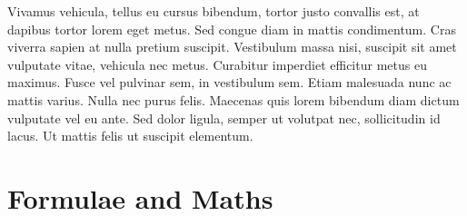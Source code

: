 Vivamus vehicula, tellus eu cursus bibendum, tortor justo convallis est, at dapibus tortor lorem eget metus. Sed congue diam in mattis condimentum. Cras viverra sapien at nulla pretium suscipit. Vestibulum massa nisi, suscipit sit amet vulputate vitae, vehicula nec metus. Curabitur imperdiet efficitur metus eu maximus. Fusce vel pulvinar sem, in vestibulum sem. Etiam malesuada nunc ac mattis varius. Nulla nec purus felis. Maecenas quis lorem bibendum diam dictum vulputate vel eu ante. Sed dolor ligula, semper ut volutpat nec, sollicitudin id lacus. Ut mattis felis ut suscipit elementum.

\section{Formulae and Maths}

